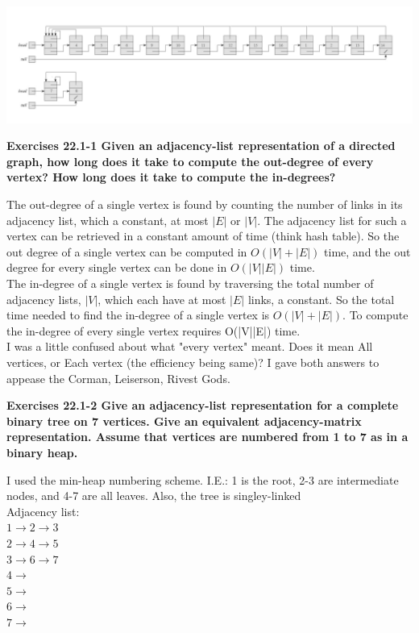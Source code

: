 \documentclass[10pt,fullpage]{article}
\begin{document}
\includegraphics{21_2.png}


\newpage

\textbf{Exercises 22.1-1 Given an adjacency-list representation of a
directed graph, how long does it take to compute the out-degree of
every vertex? How long does it take to compute the in-degrees?}

The out-degree of a single vertex is found by counting the number of
links in its adjacency list, which a constant, at most $|E|$ or
$|V|$. The adjacency list for such a vertex can be retrieved in a
constant amount of time (think hash table). So the out degree of a
single vertex can be computed in $O(|V| + |E|)$ time, and the out
degree for every single vertex can be done in $O(|V||E|)$ time.\\

The in-degree of a single vertex is found by traversing the total
number of adjacency lists, $|V|$, which each have at most $|E|$
links, a constant. So the total time needed to find the in-degree of
a single vertex is $O(|V| + |E|)$. To compute the in-degree of every single vertex requires O(|V||E|) time. \\

I was a little confused about what "every vertex" meant. Does it
mean All vertices, or Each vertex (the efficiency being same)? I
gave both answers to appease the Corman, Leiserson, Rivest Gods.

\newpage

\textbf{Exercises 22.1-2 Give an adjacency-list representation for a
complete binary tree on 7 vertices. Give an equivalent
adjacency-matrix representation. Assume that vertices are numbered
from 1 to 7 as in a binary heap.}

I used the min-heap numbering scheme. I.E.: 1 is the root, 2-3 are
intermediate nodes, and 4-7 are all leaves. Also, the tree is singley-linked\\

Adjacency list:\\
$1\rightarrow2\rightarrow3$\\
$2\rightarrow4\rightarrow5$\\
$3\rightarrow6\rightarrow7$\\
$4\rightarrow$\\
$5\rightarrow$\\
$6\rightarrow$\\
$7\rightarrow$\\
\end{document}
